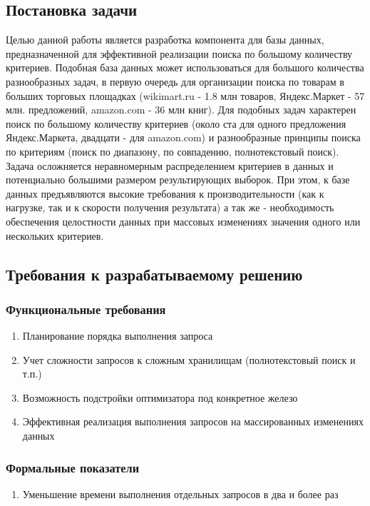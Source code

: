 \documentclass{matmex-diploma}
\begin{document}
    \subsection{Постановка задачи}
        Целью данной работы является разработка компонента для базы данных, предназначенной для эффективной реализации поиска по большому количеству критериев. Подобная база данных может использоваться для большого количества разнообразных задач, в первую очередь для организации поиска по товарам в больших торговых площадках (wikimart.ru - 1.8 млн товаров, Яндекс.Маркет - 57 млн. предложений, amazon.com - 36 млн книг). Для подобных задач характерен поиск по большому количеству критериев (около ста для одного предложения Яндекс.Маркета, двадцати - для amazon.com) и разнообразные принципы поиска по критериям (поиск по диапазону, по совпадению, полнотекстовый поиск). Задача осложняется неравномерным распределением критериев в данных и потенциально большими размером результирующих выборок. При этом, к базе данных предъявляются высокие требования к производительности (как к нагрузке, так и к скорости получения результата) а так же - необходимость обеспечения целостности данных при массовых изменениях значения одного или нескольких критериев.
    \subsection{Требования к разрабатываемому решению}
        \subsubsection{Функциональные требования}
            \begin{enumerate}
                \item Планирование порядка выполнения запроса
                \item Учет сложности запросов к сложным хранилищам (полнотекстовый поиск и т.п.)
                \item Возможность подстройки оптимизатора под конкретное железо
                \item Эффективная реализация выполнения запросов на массированных изменениях данных
            \end{enumerate}
        \subsubsection{Формальные показатели}
            \begin{enumerate}\itemsep1pt \parskip0pt  
                \item Уменьшение времени выполнения отдельных запросов в два и более раз
            \end{enumerate}
\end{document}
